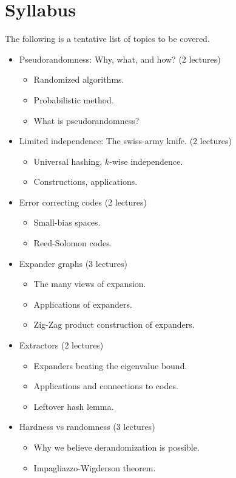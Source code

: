 \documentclass{article}[11pt]
\begin{document}
\section{Syllabus}
The following is a tentative list of topics to be covered.
\begin{itemize}
\item Pseudorandomness: Why, what, and how? (2 lectures)
\begin{itemize}
\item Randomized algorithms. 
\item Probabilistic method. 
\item What is pseudorandomness?
\end{itemize}
\item Limited independence: The swiss-army knife. (2 lectures)
\begin{itemize}
\item Universal hashing, $k$-wise independence.
\item Constructions, applications.
\end{itemize}
\item Error correcting codes (2 lectures)
\begin{itemize}
\item Small-bias spaces.
\item Reed-Solomon codes.
\end{itemize}
\item Expander graphs (3 lectures)
\begin{itemize}
\item The many views of expansion.
\item Applications of expanders.
\item Zig-Zag product construction of expanders.
\end{itemize}

\item Extractors (2 lectures)
\begin{itemize}
\item Expanders beating the eigenvalue bound.
\item Applications and connections to codes.
\item Leftover hash lemma.
\end{itemize}

\item Hardness vs randomness (3 lectures)
\begin{itemize}
\item Why we believe derandomization is possible.
\item Impagliazzo-Wigderson theorem.
\end{itemize}


\end{itemize}
\end{document}
